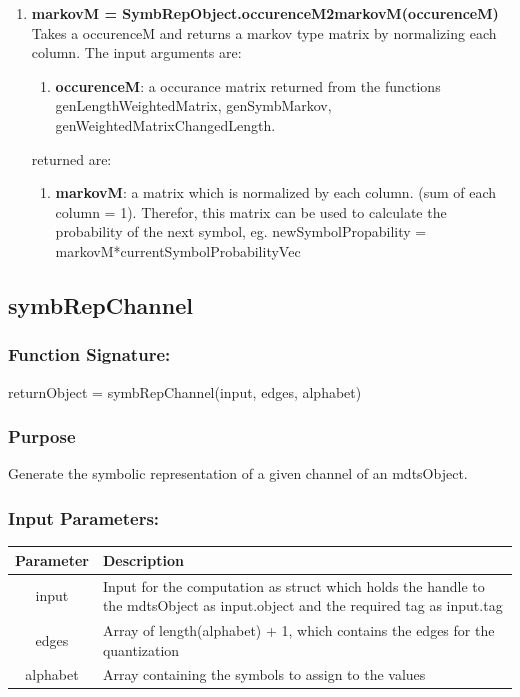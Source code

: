 \documentclass[a4]{scrreprt}
\begin{document}
\begin{enumerate}
	\item \textbf{markovM = SymbRepObject.occurenceM2markovM(occurenceM)}\\
		Takes a occurenceM and returns a markov type matrix by normalizing each column.
		The input arguments are:
		\begin{enumerate}
			\item \textbf{occurenceM}: a occurance matrix returned from the functions genLengthWeightedMatrix, genSymbMarkov, genWeightedMatrixChangedLength.
		\end{enumerate}
		returned are:
		\begin{enumerate}
			\item \textbf{markovM}:  a matrix which is normalized by each column. (sum of each column = 1). Therefor, this matrix can be used to  calculate the probability of the next symbol, eg.  newSymbolPropability = markovM*currentSymbolProbabilityVec
		\end{enumerate}
	
\end{enumerate}

\subsection{symbRepChannel}

\subsubsection{Function Signature:}

\begin{center}
	returnObject = symbRepChannel(input, edges, alphabet)
\end{center}

\subsubsection{Purpose}

Generate the symbolic representation of a given channel of an mdtsObject.

\subsubsection{Input Parameters:}

\begin{longtabu} to \textwidth {|c|X|}
	\hline
	\textbf{Parameter} & \textbf{Description} \\ \hline
	\endhead
	input & Input for the computation as struct which holds the handle to the mdtsObject as input.object and the required tag as input.tag \\ \hline
	edges & Array of length(alphabet) + 1, which contains the edges for the quantization \\ \hline
	alphabet & Array containing the symbols to assign to the values \\ \hline
\end{longtabu}
\end{document}
